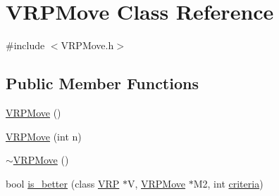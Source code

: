 \hypertarget{class_v_r_p_move}{
\section{VRPMove Class Reference}
\label{class_v_r_p_move}
}


{\ttfamily \#include $<$VRPMove.h$>$}

\subsection*{Public Member Functions}
\begin{DoxyCompactItemize}
\item 
\hyperlink{class_v_r_p_move_a75e3a502aea77df087ea9766b1591c9a}{VRPMove} ()
\item 
\hyperlink{class_v_r_p_move_a02ac2c77fd4e7e788d7282c7846a099b}{VRPMove} (int n)
\item 
\hyperlink{class_v_r_p_move_ad85aad2aaee02d4321236e20e44ea630}{$\sim$VRPMove} ()
\item 
bool \hyperlink{class_v_r_p_move_ae3f9dea631ef3fc35e314994c30dc96b}{is\_\-better} (class \hyperlink{class_v_r_p}{VRP} $\ast$V, \hyperlink{class_v_r_p_move}{VRPMove} $\ast$M2, int \hyperlink{class_v_r_p_move_a964ab5cd85cfcccc2acc8b8088980d5d}{criteria})
\end{DoxyCompactItemize}
